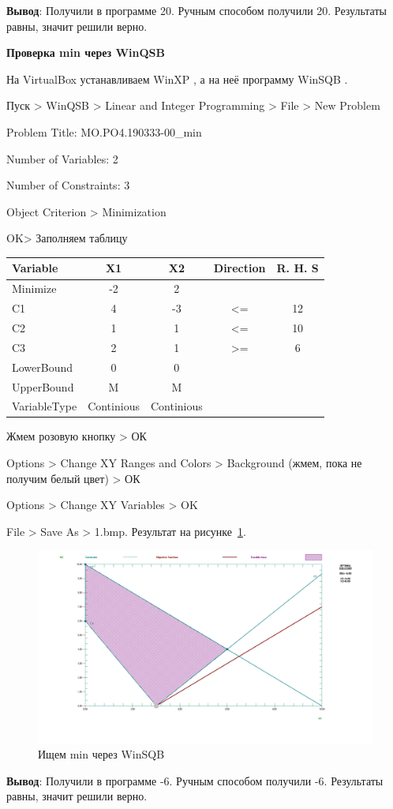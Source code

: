 \textbf{Вывод}: Получили в программе 20. Ручным способом получили 20. Результаты равны, значит решили верно.

\newpage

\begin{center}
\textbf{Проверка min через WinQSB}
\end{center}

На VirtualBox \cite{VirtualBox} устанавливаем WinXP \cite{WinXP}, а на неё программу WinSQB \cite{WinQSB}.

Пуск > WinQSB > Linear and Integer Programming > File > New Problem

Problem Title: MO.PO4.190333-00\_min

Number of Variables: 2

Number of Constraints: 3

Object Criterion > Minimization

OK> Заполняем таблицу

\begin{table}[h!]
  \centering
  \begin{tabular}{ |l||c|c|c|c| } 
    \hline
    Variable & X1 & X2 & Direction & R. H. S \\ \hline
    \hline
    Minimize & -2 & 2 &  & \\ \hline
    C1 & 4 & -3 & <= & 12 \\ \hline
    C2 & 1 & 1 & <= & 10 \\ \hline
    C3 & 2 & 1 & >= & 6 \\ \hline
    LowerBound & 0 & 0 &  & \\ \hline
    UpperBound & M & M &  & \\ \hline
    VariableType & Continious & Continious &  & \\ \hline
  \end{tabular}
\end{table}

Жмем розовую кнопку > ОК

Options > Change XY Ranges and Colors > Background (жмем, пока не получим белый цвет) > ОК

Options > Change XY Variables > OK

File > Save As > 1.bmp. Результат на рисунке~\ref{fig:min}.

\begin{figure}[!htb]
  \centering

  \includegraphics[width=16cm]
  {inc/min.png}

  \caption{Ищем min через WinSQB}
  \label{fig:min}
\end{figure}

\textbf{Вывод}: Получили в программе -6. Ручным способом получили -6. Результаты равны, значит решили верно.
